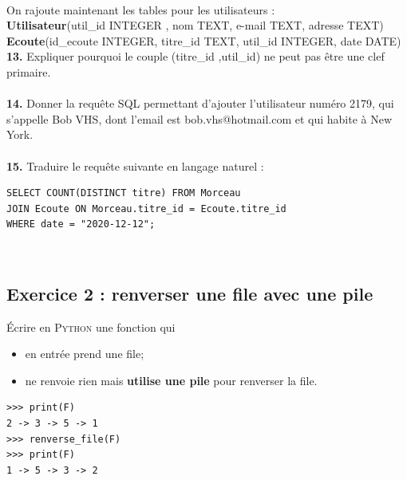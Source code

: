 \documentclass[article,a4paper,firamath,12pt]{nsi}
\begin{document}
\\


On rajoute maintenant les tables pour les utilisateurs :\\

\textbf{Utilisateur}(util\_id INTEGER , nom TEXT, e-mail TEXT, adresse TEXT)\\
\textbf{Ecoute}(id\_ecoute INTEGER, titre\_id TEXT, util\_id INTEGER, date DATE)\\

\textbf{13.}	Expliquer pourquoi le couple (titre\_id ,util\_id) ne peut pas être une clef primaire.\\

\\
\newpage
\textbf{14.}	Donner la requête SQL permettant d'ajouter l'utilisateur numéro 2179, qui s'appelle Bob
VHS, dont l'email est bob.vhs@hotmail.com et qui habite à New York.\\

\\

\textbf{15.}	Traduire le requête suivante en langage naturel :
\begin{sql}
    \begin{verbatim}
SELECT COUNT(DISTINCT titre) FROM Morceau
JOIN Ecoute ON Morceau.titre_id = Ecoute.titre_id 
WHERE date = "2020-12-12";
        \end{verbatim}
\end{sql}


\\

\subsection*{Exercice 2 : renverser une file avec une pile}

\'Ecrire en \textsc{Python} une fonction  qui
\begin{itemize}
    \item 	en entrée prend une file;
    \item 	ne renvoie rien mais \textbf{utilise une pile} pour renverser la file.
\end{itemize}
\begin{exemple}[ d'utilisation]
    \begin{verbatim}
>>> print(F)
2 -> 3 -> 5 -> 1
>>> renverse_file(F)
>>> print(F)
1 -> 5 -> 3 -> 2
\end{verbatim}
\end{exemple}
\end{document}
